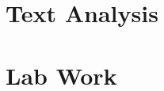 
\renewcommand{\subsubsection}[1]{\paragraph{#1}}









\graphicspath{{lectures/}{lectures/text_analysis/}}
\part{Text Analysis}


\graphicspath{{labs/}}
\part{Lab Work}




